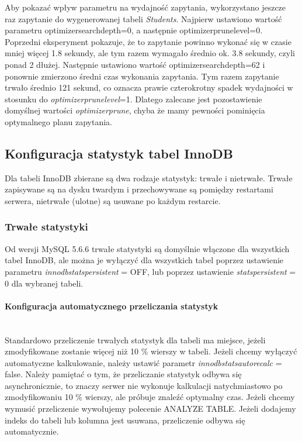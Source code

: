 Aby pokazać wpływ parametru na wydajność zapytania, wykorzystano jeszcze raz zapytanie do wygenerowanej tabeli \textit{Students}. Najpierw ustawiono wartość parametru optimizer\textunderscore search\textunderscore depth=0, a następnie optimizer\textunderscore prune\textunderscore level=0. Poprzedni eksperyment pokazuje, że to zapytanie powinno wykonać się w czasie mniej więcej 1.8 sekundy, ale tym razem wymagało średnio ok. 3.8 sekundy, czyli ponad 2 dłużej. Następnie ustawiono wartość optimizer\textunderscore search\textunderscore depth=62 i ponownie zmierzono średni czas wykonania zapytania. Tym razem zapytanie trwało średnio 121 sekund, co oznacza prawie czterokrotny spadek wydajności w stosunku do \textit{optimizer\textunderscore prune\textunderscore level}=1. Dlatego zalecane jest pozostawienie domyślnej wartości \textit{ optimizer\textunderscore prune}, chyba że mamy pewności pominięcia optymalnego planu zapytania.

\subsection{Konfiguracja statystyk tabel InnoDB}
Dla tabeli InnoDB zbierane są dwa rodzaje statystyk: trwałe i nietrwałe. Trwałe zapisywane są na dysku twardym i przechowywane są pomiędzy restartami serwera, nietrwałe (ulotne) są usuwane po każdym restarcie. 

\subsubsection{Trwałe statystyki}
Od wersji MySQL 5.6.6 trwałe statystyki są domyślnie włączone dla wszystkich tabel InnoDB, ale można je wyłączyć dla wszystkich tabel poprzez ustawienie parametru \textit{innodb\textunderscore stats\textunderscore persistent} = OFF, lub poprzez ustawienie \textit{stats\textunderscore persistent} = 0 dla wybranej tabeli.

\paragraph{Konfiguracja automatycznego przeliczania statystyk}\mbox{}\\
\smallskip
Standardowo przeliczenie trwałych statystyk dla tabeli ma miejsce, jeżeli zmodyfikowane zostanie więcej niż 10 \% wierszy w tabeli. Jeżeli chcemy wyłączyć automatyczne kalkulowanie, należy ustawić parametr \textit{innodb\textunderscore stats\textunderscore auto\textunderscore recalc} = false. Należy pamiętać o tym, że przeliczanie statystyk odbywa się asynchronicznie, to znaczy serwer nie wykonuje kalkulacji natychmiastowo po zmodyfikowaniu 10 \% wierszy, ale próbuje znaleźć optymalny czas. Jeżeli chcemy wymusić przeliczenie wywołujemy polecenie ANALYZE TABLE. Jeżeli dodajemy indeks do tabeli lub kolumna jest usuwana, przeliczenie odbywa się automatycznie.

